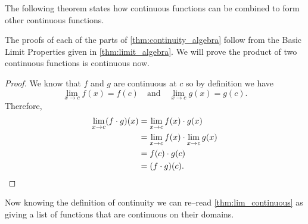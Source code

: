 The following theorem states how continuous functions can be combined to form other continuous functions.


The proofs of each of the parts of \autoref{thm:continuity_algebra} follow from the Basic Limit Properties given in \autoref{thm:limit_algebra}. We will prove the product of two continuous functions is continuous now.

\begin{proof}
We know that $f$ and $g$ are continuous at $c$ so by definition we have
\[\lim_{x\to c}f(x)=f(c) \quad \text{and} \quad \lim_{x\to c} g(x)=g(c).\]
Therefore,
\begin{align*}
\lim_{x\to c} (f\cdot g)(x)&=\lim_{x\to c} f(x)\cdot g(x)\\
&=\lim_{x\to c}f(x) \cdot \lim_{x\to c} g(x)\\
&=f(c)\cdot g(c)\\
&=(f\cdot g)(c).\qedhere
\end{align*}
\end{proof}


Now knowing the definition of continuity we can re--read \autoref{thm:lim_continuous} as giving a list of functions that are continuous on their domains.

